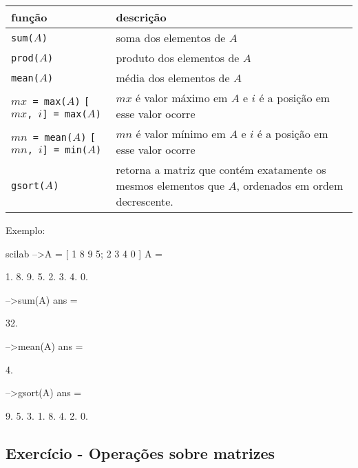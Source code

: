 \documentclass[11pt,fleqn]{practice}
\begin{document}
\begin{center}
  \begin{tabular}{p{4cm}p{8cm}} \hline
    \textbf{função} & \textbf{descrição} \\\hline
    \texttt{sum($A$)} & soma dos elementos de $A$ \\\hline
    \texttt{prod($A$)} & produto dos elementos de $A$ \\\hline
    \texttt{mean($A$)} & média dos elementos de $A$ \\\hline
    \texttt{$mx$ = max($A$)} \newline \texttt{[$mx$, $i$] = max($A$)} & $mx$ é valor máximo em $A$ e \newline $i$ é a posição em esse valor ocorre \\\hline
    \texttt{$mn$ = mean($A$)} \newline \texttt{[$mn$, $i$] = min($A$)} & $mn$ é valor mínimo em $A$ e \newline $i$ é a posição em esse valor ocorre \\\hline
   \texttt{gsort($A$)} & retorna a matriz que contém exatamente os mesmos elementos que $A$, ordenados em ordem decrescente. 
  \end{tabular}
\end{center}

Exemplo:
\begin{lst}{scilab}
-->A = [ 1 8 9 5; 2 3 4 0 ]
 A  =
 
    1.    8.    9.    5.  
    2.    3.    4.    0.  
 
-->sum(A)
 ans  =

    32.

-->mean(A)
 ans  =

     4.

-->gsort(A)
 ans  =

    9.     5.    3.   1.
    8.     4.    2.   0.

\end{lst}

\subsection{Exercício - Operações sobre matrizes}
\end{document}
